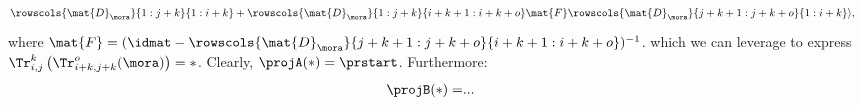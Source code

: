 {\begin{example}
\begin{equation}
\begin{aligned}
                                             & \rowscols{\mat{D}_\mora}{1:j+k}{1:i+k}+\rowscols{\mat{D}_\mora}{1:j+k}{i+k+1:i+k+o}\mat{F} \rowscols{\mat{D}_\mora}{j+k+1:j+k+o}{1:i+k}\rangle,
        \end{aligned}
    \end{equation}
    where $\mat{F}=(\idmat-\rowscols{\mat{D}_\mora}{j+k+1:j+k+o}{i+k+1:i+k+o})^{-1}$.
    which we can leverage to express $\Tr_{i,j}^{k}\left(\Tr_{i+k,j+k}^o(\mora)\right)=\ast$.
    Clearly, $\projA(\ast)=\prstart$.
    Furthermore:
    \begin{equation*}
        \begin{aligned}
            \projB(\ast)= & .
            ..
        \end{aligned}
    \end{equation*}


\end{example}}
